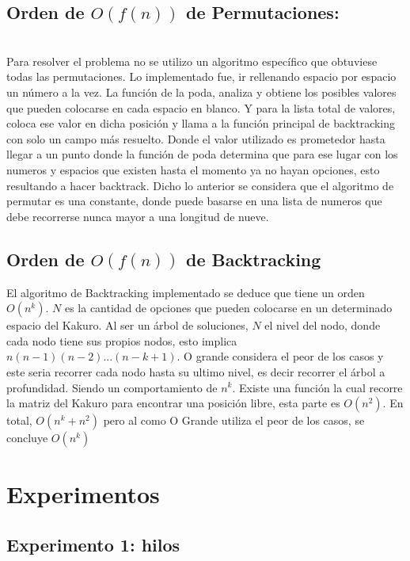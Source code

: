 \documentclass[conference]{IEEEtran}
\begin{document}
\newline




\subsection{Orden de $O(f(n))$ de Permutaciones:}\\
Para resolver el problema no se utilizo un algoritmo espec\'ifico que obtuviese todas las permutaciones. Lo implementado fue, ir rellenando espacio por espacio un n\'umero a la vez. La funci\'on de la poda, analiza y obtiene los posibles valores que pueden colocarse en cada espacio en blanco. Y para la lista total de valores, coloca ese valor en dicha posici\'on y llama a la funci\'on principal de backtracking con solo un campo m\'as resuelto. Donde el valor utilizado es prometedor hasta llegar a un punto donde la funci\'on de poda determina que para ese lugar con los numeros y espacios que existen hasta el momento ya no hayan opciones, esto resultando a hacer backtrack. Dicho lo anterior se considera que el algoritmo de permutar es una constante, donde puede basarse en una lista de numeros que debe recorrerse nunca mayor a una longitud de nueve.
\newline


\subsection{Orden de $O(f(n))$ de Backtracking}
El algoritmo de Backtracking implementado se deduce que tiene un orden $O(n^k)$. $N$ es la cantidad de opciones que pueden colocarse en un determinado espacio del Kakuro. Al ser un \'arbol de soluciones, $N$ el nivel del nodo,  donde cada nodo tiene sus propios nodos, esto implica $n(n-1)(n-2)...(n-k+1)$. O grande considera el peor de los casos y este seria recorrer cada nodo hasta su ultimo nivel, es decir recorrer el \'arbol a profundidad. Siendo un comportamiento de $n^k$. Existe una funci\'on la cual recorre la matriz del Kakuro para encontrar una posici\'on libre, esta parte es $O(n^2)$. En total, $O(n^k + n^2)$ pero al como O Grande utiliza el peor de los casos, se concluye $O(n^k)$



\section{Experimentos}
\subsection{Experimento 1: hilos}
\end{document}
